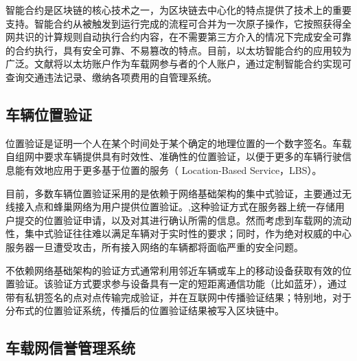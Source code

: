 智能合约是区块链的核心技术之一，为区块链去中心化的特点提供了技术上的重要支持。智能合约从被触发到运行完成的流程可合并为一次原子操作，它按照获得全网共识的计算规则自动执行合约内容，在不需要第三方介入的情况下完成安全可靠的合约执行，具有安全可靠、不易篡改的特点。目前，以太坊智能合约的应用较为广泛。文献\cite{blockchaineth}将以太坊账户作为车载网参与者的个人账户，通过定制智能合约实现可查询交通违法记录、缴纳各项费用的自管理系统。

\subsection{车辆位置验证}

位置验证是证明一个人在某个时间处于某个确定的地理位置的一个数字签名\cite{p2ppof}。车载自组网中要求车辆提供具有时效性、准确性的位置验证，以便于更多的车辆行驶信息能有效地应用于更多基于位置的服务（ Location-Based Service，LBS）。

目前，多数车辆位置验证采用的是依赖于网络基础架构的集中式验证，主要通过无线接入点和蜂巢网络为用户提供位置验证。\cite{alice, Lu2016Privacy},这种验证方式在服务器上统一存储用户提交的位置验证申请，以及对其进行确认所需的信息。然而考虑到车载网的流动性，集中式验证往往难以满足车辆对于实时性的要求；同时，作为绝对权威的中心服务器一旦遭受攻击，所有接入网络的车辆都将面临严重的安全问题。

不依赖网络基础架构的验证方式通常利用邻近车辆或车上的移动设备获取有效的位置验证。该验证方式要求参与设备具有一定的短距离通信功能（比如蓝牙）\cite{2013Toward}，通过带有私钥签名的点对点传输完成验证，并在互联网中传播验证结果；特别地，对于分布式的位置验证系统，传播后的位置验证结果被写入区块链中\cite{p2ppof}。

\subsection{车载网信誉管理系统}


